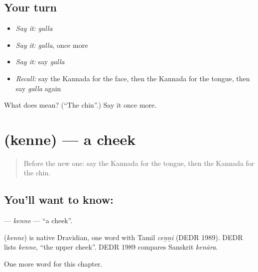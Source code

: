 \subsection*{Your turn}
\begin{itemize}
\raggedright
  \item \emph{Say it:} \emph{galla}
  \item \emph{Say it:} \emph{galla}, once more
  \item \emph{Say it:} say \emph{galla}
  \item \emph{Recall:} say the Kannada for the face, then the Kannada for the tongue, then say \emph{galla} again
\end{itemize}

\begin{tcolorbox}[breakable,colback=teal!4,colframe=teal!35!black,title={Before you move on}]
What does  mean? (\textquotedblleft{}The chin\textquotedblright{}.) Say it once more.
\end{tcolorbox}
\section[\texorpdfstring{\kn{ಕೆನ್ನೆ} (kenne)}{ಕೆನ್ನೆ (kenne)}]{ (kenne) — a cheek}

\label{lesson:KA-C135-kenne}



\begin{quote}
Before the new one: say the Kannada for the tongue, then the Kannada for the chin.
\end{quote}

\subsection*{You'll want to know: }
\textbf{} — \emph{kenne} — \textquotedblleft{}a cheek\textquotedblright{}.

\begin{cousinweb}
\textbf{} (\emph{kenne}) is native Dravidian, one word with Tamil \emph{ceṉṉi} (DEDR 1989). DEDR lists \emph{kenne}, \textquotedblleft{}the upper cheek\textquotedblright{}. DEDR 1989 compares Sanskrit \emph{kenāra}.
\end{cousinweb}

\begin{grammarlens}[title={What you've built}]
One more word for this chapter.
\end{grammarlens}

